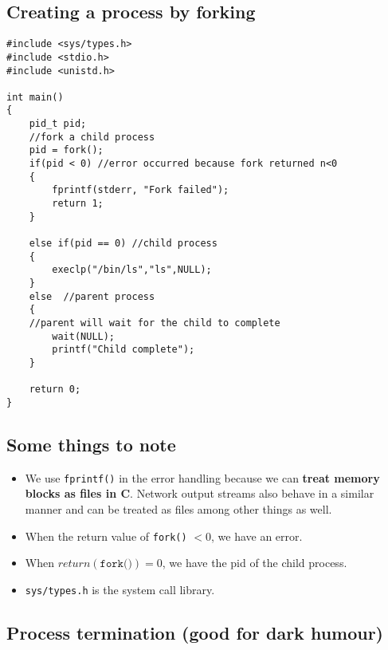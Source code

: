 \documentclass[12pt]{book}
\begin{document}
\newpage
\subsection*{Creating a process by forking}
\begin{lstlisting}
#include <sys/types.h>
#include <stdio.h>
#include <unistd.h>

int main()
{
    pid_t pid;
    //fork a child process
    pid = fork();
    if(pid < 0) //error occurred because fork returned n<0
    {
        fprintf(stderr, "Fork failed");
        return 1;
    }

    else if(pid == 0) //child process
    {
        execlp("/bin/ls","ls",NULL);
    }
    else  //parent process
    {
    //parent will wait for the child to complete
        wait(NULL);
        printf("Child complete");
    }

    return 0;
}
\end{lstlisting}

\subsection*{Some things to note}

\begin{itemize}
    \item We use \texttt{fprintf()} in the error handling because we can \textbf{treat memory blocks as files in C}. Network output streams also behave in a similar manner and can be treated as files among other things as well.
    \item When the return value of \texttt{fork()} $<0$, we have an error.
    \item When $return(\texttt{fork()})=0$, we have the pid of the child process.
    \item \texttt{sys/types.h} is the system call library.
\end{itemize}

\subsection*{Process termination (good for dark humour)}
\end{document}
